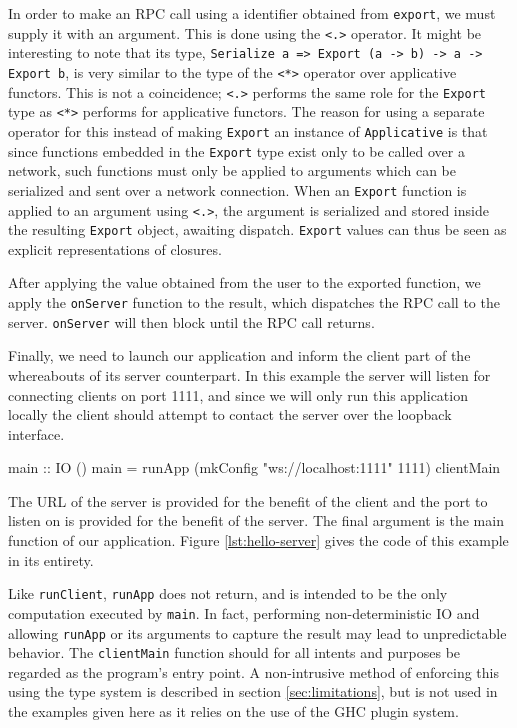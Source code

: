 \documentclass[preprint]{sigplanconf}
\begin{document}
In order to make an RPC call using a identifier obtained from \lstinline!export!,
we must supply it with an argument. This is done using the \lstinline!<.>!
operator. It might be interesting to note that its type,
\linebreak
\lstinline!Serialize a => Export (a -> b) -> a -> Export b!,
is very similar to the type of the \lstinline!<*>! operator over applicative
functors. This is not a coincidence; \lstinline!<.>! performs the same role
for the \lstinline!Export! type as \lstinline!<*>! performs for applicative
functors. The reason for using a separate operator for this instead of making
\lstinline!Export! an instance of \lstinline!Applicative! is that since
functions embedded in the \lstinline!Export! type exist only to be called over
a network, such functions must only be applied to arguments which can be
serialized and sent over a network connection. When an \lstinline!Export!
function is applied to an argument using \lstinline!<.>!, the argument is
serialized and stored inside the resulting \lstinline!Export! object, awaiting
dispatch. \lstinline!Export! values can thus be seen as explicit
representations of closures.

After applying the value obtained from the user to the exported function,
we apply the \lstinline!onServer! function to the result, which dispatches
the RPC call to the server. \lstinline!onServer! will then block until the
RPC call returns.

Finally, we need to launch our application and inform the client part of the
whereabouts of its server counterpart. In this example the server will listen
for connecting clients on port 1111, and since we will only run this
application locally the client should attempt to contact the server over the
loopback interface.

\begin{code}
main :: IO ()
main = runApp (mkConfig "ws://localhost:1111" 1111)
              clientMain
\end{code}

The URL of the server is provided for the benefit of the client and the port
to listen on is provided for the benefit of the server. The final argument is
the main function of our application. Figure \ref{lst:hello-server} gives the
code of this example in its entirety.

Like \lstinline!runClient!, \lstinline!runApp! does not return, and is intended
to be the only computation executed by \lstinline!main!. In fact, performing
non-deterministic IO and allowing \lstinline!runApp! or its arguments to
capture the result may lead to unpredictable behavior. The \lstinline!clientMain!
function should for all intents and purposes be regarded as the program's entry
point. A non-intrusive method of enforcing this using the type system is
described in section \ref{sec:limitations}, but is not used in the examples
given here as it relies on the use of the GHC plugin system.
\end{document}
